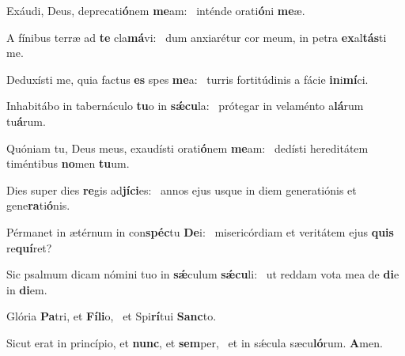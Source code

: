 \item Exáudi, Deus, deprecati\textbf{ó}nem \textbf{me}am:~\psstar{} inténde orati\textbf{ó}ni \textbf{me}æ.
\item A fínibus terræ ad \textbf{te} cla\textbf{má}vi:~\psstar{} dum anxiarétur cor meum, in petra \textbf{ex}al\textbf{tás}ti me.
\item Deduxísti me, quia factus \textbf{es} spes \textbf{me}a:~\psstar{} turris fortitúdinis a fácie \textbf{in}i\textbf{mí}ci.
\item Inhabitábo in tabernáculo \textbf{tu}o in \textbf{sǽ}\textbf{cu}la:~\psstar{} prótegar in velaménto a\textbf{lá}rum tu\textbf{á}rum.
\item Quóniam tu, Deus meus, exaudísti orati\textbf{ó}nem \textbf{me}am:~\psstar{} dedísti hereditátem timéntibus \textbf{no}men \textbf{tu}um.
\item Dies super dies \textbf{re}gis ad\textbf{jí}\textbf{ci}es:~\psstar{} annos ejus usque in diem generatiónis et gene\textbf{ra}ti\textbf{ó}nis.
\item Pérmanet in ætérnum in con\textbf{spéc}tu \textbf{De}i:~\psstar{} misericórdiam et veritátem ejus \textbf{quis} re\textbf{quí}ret?
\item Sic psalmum dicam nómini tuo in \textbf{sǽ}culum \textbf{sǽ}\textbf{cu}li:~\psstar{} ut reddam vota mea de \textbf{di}e in \textbf{di}em.
\item Glória \textbf{Pa}tri, et \textbf{Fí}\textbf{li}o,~\psstar{} et Spi\textbf{rí}tui \textbf{Sanc}to.
\item Sicut erat in princípio, et \textbf{nunc}, et \textbf{sem}per,~\psstar{} et in sǽcula sæcu\textbf{ló}rum. \textbf{A}men.